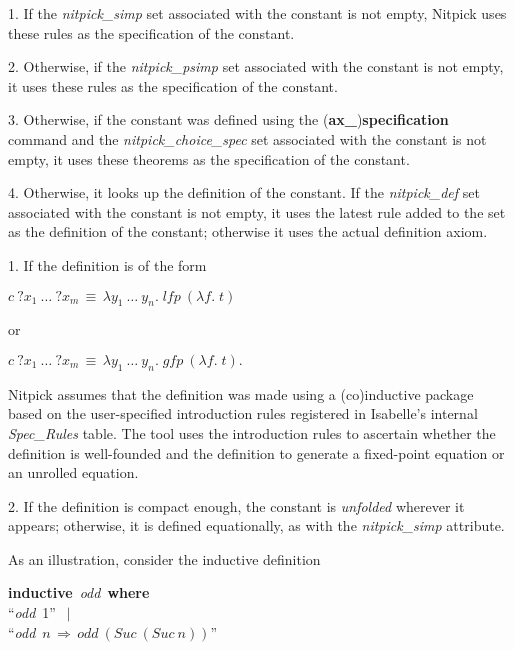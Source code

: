 \documentclass[a4paper,12pt]{article}
\begin{document}
\begin{enum}
\item[1.] If the \textit{nitpick\_simp} set associated with the constant
is not empty, Nitpick uses these rules as the specification of the constant.

\item[2.] Otherwise, if the \textit{nitpick\_psimp} set associated with
the constant is not empty, it uses these rules as the specification of the
constant.

\item[3.] Otherwise, if the constant was defined using the
\hbox{(\textbf{ax\_})}\allowbreak\textbf{specification} command and the
\textit{nitpick\_choice\_spec} set associated with the constant is not empty, it
uses these theorems as the specification of the constant.

\item[4.] Otherwise, it looks up the definition of the constant. If the
\textit{nitpick\_def} set associated with the constant is not empty, it uses the
latest rule added to the set as the definition of the constant; otherwise it
uses the actual definition axiom.

\begin{enum}
\item[1.] If the definition is of the form

\qquad $c~{?}x_1~\ldots~{?}x_m \,\equiv\, \lambda y_1~\ldots~y_n.\; \textit{lfp}~(\lambda f.\; t)$

or

\qquad $c~{?}x_1~\ldots~{?}x_m \,\equiv\, \lambda y_1~\ldots~y_n.\; \textit{gfp}~(\lambda f.\; t).$

Nitpick assumes that the definition was made using a (co)inductive package
based on the user-specified introduction rules registered in Isabelle's internal
\textit{Spec\_Rules} table. The tool uses the introduction rules to ascertain
whether the definition is well-founded and the definition to generate a
fixed-point equation or an unrolled equation.

\item[2.] If the definition is compact enough, the constant is \textsl{unfolded}
wherever it appears; otherwise, it is defined equationally, as with
the \textit{nitpick\_simp} attribute.
\end{enum}
\end{enum}

As an illustration, consider the inductive definition

\prew
\textbf{inductive}~\textit{odd}~\textbf{where} \\
``\textit{odd}~1'' $\,\mid$ \\
``\textit{odd}~$n\,\Longrightarrow\, \textit{odd}~(\textit{Suc}~(\textit{Suc}~n))$''
\postw
\end{document}
